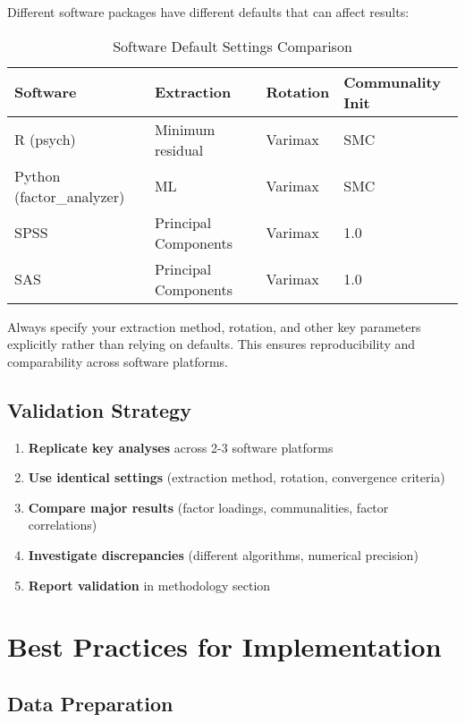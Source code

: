 \documentclass[a4paper]{tufte-book}
\begin{document}
Different software packages have different defaults that can affect results:

\begin{table}[h]
\centering
\caption{Software Default Settings Comparison}
\begin{tabular}{@{}llll@{}}
\toprule
\textbf{Software} & \textbf{Extraction} & \textbf{Rotation} & \textbf{Communality Init} \\
\midrule
R (psych) & Minimum residual & Varimax & SMC \\
Python (factor\_analyzer) & ML & Varimax & SMC \\
SPSS & Principal Components & Varimax & 1.0 \\
SAS & Principal Components & Varimax & 1.0 \\
\bottomrule
\end{tabular}
\end{table}

\begin{learningtip}
Always specify your extraction method, rotation, and other key parameters explicitly rather than relying on defaults. This ensures reproducibility and comparability across software platforms.
\end{learningtip}

\subsection{Validation Strategy}

\begin{enumerate}
\item \textbf{Replicate key analyses} across 2-3 software platforms
\item \textbf{Use identical settings} (extraction method, rotation, convergence criteria)
\item \textbf{Compare major results} (factor loadings, communalities, factor correlations)
\item \textbf{Investigate discrepancies} (different algorithms, numerical precision)
\item \textbf{Report validation} in methodology section
\end{enumerate}

\section{Best Practices for Implementation}

\subsection{Data Preparation}
\end{document}
